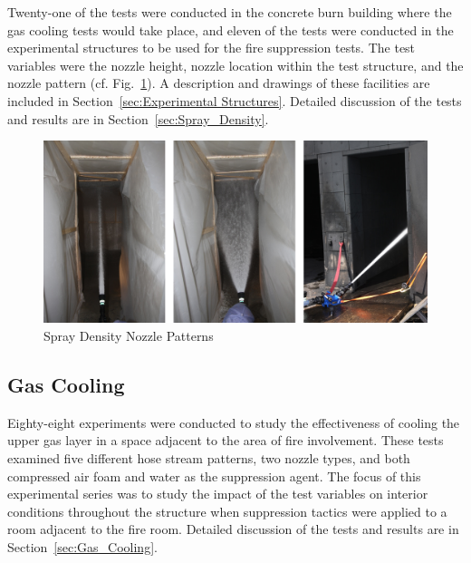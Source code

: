 \documentclass[12pt,oneside]{book}
\begin{document}
Twenty-one of the tests were conducted in the concrete burn building where the gas cooling tests would take place, and eleven of the tests were conducted in the experimental structures to be used for the fire suppression tests. The test variables were the nozzle height, nozzle location within the test structure, and the nozzle pattern (cf. Fig.~\ref{fig:Spray_Density_Nozzle_Patterns}). A description and drawings of these facilities are included in Section~\ref{sec:Experimental Structures}. Detailed discussion of the tests and results are in Section~\ref{sec:Spray_Density}.

\begin{figure}[!ht]
	\includegraphics[width=6in]{../Figures/Pictures/Flows}
	\caption{Spray Density Nozzle Patterns}
	\label{fig:Spray_Density_Nozzle_Patterns}
\end{figure}



\subsection{Gas Cooling}
\label{sec:desc_Gas_Cooling}

Eighty-eight experiments were conducted to study the effectiveness of cooling the upper gas layer in a space adjacent to the area of fire involvement. These tests examined five different hose stream patterns, two nozzle types, and both compressed air foam and water as the suppression agent. The focus of this experimental series was to study the impact of the test variables on interior conditions throughout the structure when suppression tactics were applied to a room adjacent to the fire room. Detailed discussion of the tests and results are in Section~\ref{sec:Gas_Cooling}.
\end{document}
